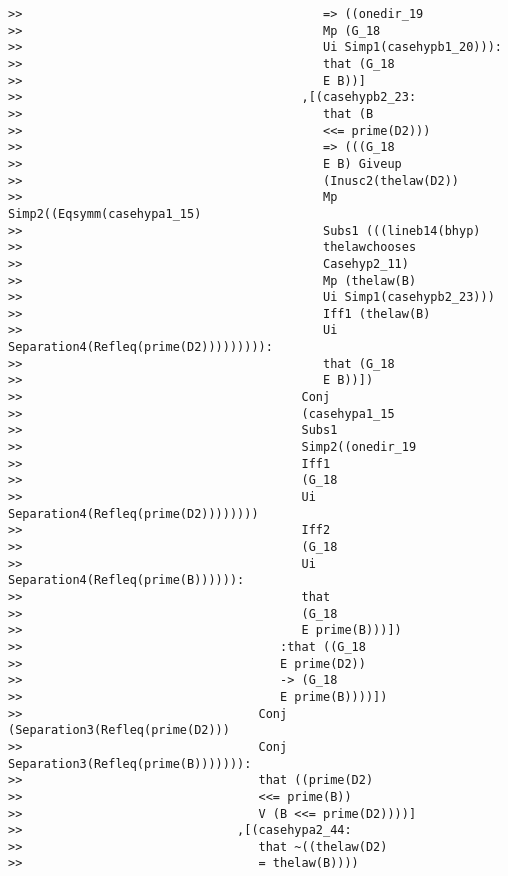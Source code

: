 \documentclass[12pt]{article}
\begin{document}
\begin{verbatim}
>>                                          => ((onedir_19
>>                                          Mp (G_18
>>                                          Ui Simp1(casehypb1_20))):
>>                                          that (G_18
>>                                          E B))]
>>                                       ,[(casehypb2_23:
>>                                          that (B
>>                                          <<= prime(D2)))
>>                                          => (((G_18
>>                                          E B) Giveup
>>                                          (Inusc2(thelaw(D2))
>>                                          Mp Simp2((Eqsymm(casehypa1_15)
>>                                          Subs1 (((lineb14(bhyp)
>>                                          thelawchooses
>>                                          Casehyp2_11)
>>                                          Mp (thelaw(B)
>>                                          Ui Simp1(casehypb2_23)))
>>                                          Iff1 (thelaw(B)
>>                                          Ui Separation4(Refleq(prime(D2))))))))):
>>                                          that (G_18
>>                                          E B))])
>>                                       Conj
>>                                       (casehypa1_15
>>                                       Subs1
>>                                       Simp2((onedir_19
>>                                       Iff1
>>                                       (G_18
>>                                       Ui Separation4(Refleq(prime(D2))))))))
>>                                       Iff2
>>                                       (G_18
>>                                       Ui Separation4(Refleq(prime(B)))))):
>>                                       that
>>                                       (G_18
>>                                       E prime(B)))])
>>                                    :that ((G_18
>>                                    E prime(D2))
>>                                    -> (G_18
>>                                    E prime(B))))])
>>                                 Conj (Separation3(Refleq(prime(D2)))
>>                                 Conj Separation3(Refleq(prime(B))))))):
>>                                 that ((prime(D2)
>>                                 <<= prime(B))
>>                                 V (B <<= prime(D2))))]
>>                              ,[(casehypa2_44:
>>                                 that ~((thelaw(D2)
>>                                 = thelaw(B))))

\end{verbatim}
\end{document}
